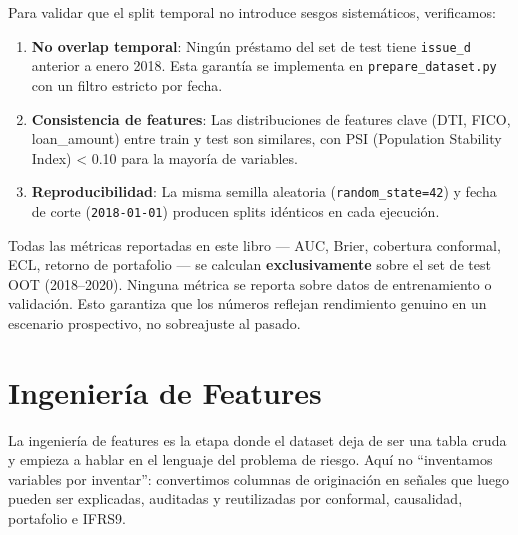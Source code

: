 \documentclass[
  spanish,
  11pt,
  letterpaper,
]{scrbook}
\providecommand{\tightlist}{%
  \setlength{\itemsep}{0pt}\setlength{\parskip}{0pt}}
\theoremstyle{plain}
\theoremstyle{remark}
\begin{document}
Para validar que el split temporal no introduce sesgos sistemáticos,
verificamos:

\begin{enumerate}
\def\labelenumi{\arabic{enumi}.}
\tightlist
\item
  \textbf{No overlap temporal}: Ningún préstamo del set de test tiene
  \texttt{issue\_d} anterior a enero 2018. Esta garantía se implementa
  en \texttt{prepare\_dataset.py} con un filtro estricto por fecha.
\item
  \textbf{Consistencia de features}: Las distribuciones de features
  clave (DTI, FICO, loan\_amount) entre train y test son similares, con
  PSI (Population Stability Index) \textless{} 0.10 para la mayoría de
  variables.
\item
  \textbf{Reproducibilidad}: La misma semilla aleatoria
  (\texttt{random\_state=42}) y fecha de corte (\texttt{2018-01-01})
  producen splits idénticos en cada ejecución.
\end{enumerate}

\begin{tcolorbox}[enhanced jigsaw, arc=.35mm, bottomrule=.15mm, bottomtitle=1mm, breakable, colback=white, colbacktitle=quarto-callout-tip-color!10!white, colframe=quarto-callout-tip-color-frame, coltitle=black, left=2mm, leftrule=.75mm, opacityback=0, opacitybacktitle=0.6, rightrule=.15mm, title=\textcolor{quarto-callout-tip-color}{\faLightbulb}\hspace{0.5em}{Implicación para el lector}, titlerule=0mm, toprule=.15mm, toptitle=1mm]

Todas las métricas reportadas en este libro --- AUC, Brier, cobertura
conformal, ECL, retorno de portafolio --- se calculan
\textbf{exclusivamente} sobre el set de test OOT (2018--2020). Ninguna
métrica se reporta sobre datos de entrenamiento o validación. Esto
garantiza que los números reflejan rendimiento genuino en un escenario
prospectivo, no sobreajuste al pasado.

\end{tcolorbox}

\chapter{Ingeniería de Features}\label{ingenieruxeda-de-features}

La ingeniería de features es la etapa donde el dataset deja de ser una
tabla cruda y empieza a hablar en el lenguaje del problema de riesgo.
Aquí no ``inventamos variables por inventar'': convertimos columnas de
originación en señales que luego pueden ser explicadas, auditadas y
reutilizadas por conformal, causalidad, portafolio e IFRS9.
\end{document}

